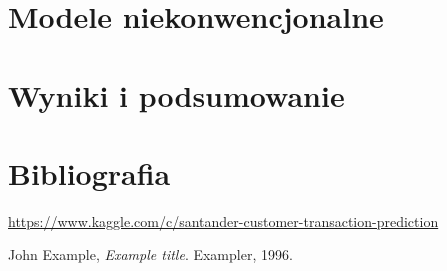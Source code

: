 \documentclass[12pt]{article}
\begin{document}
\section{Modele niekonwencjonalne}

\section{Wyniki i podsumowanie}


\newpage

\section{Bibliografia}
\begin{thebibliography}{9}

\url{https://www.kaggle.com/c/santander-customer-transaction-prediction}

  John Example,
  \textit{Example title}.
  Exampler,
  1996.

\end{thebibliography}
\end{document}
